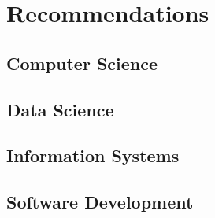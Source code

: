 \documentclass{article}
\begin{document}
	\section{Recommendations}
	\subsection{Computer Science}
	\subsection{Data Science}
	\subsection{Information Systems}
	\subsection{Software Development}
\end{document}
